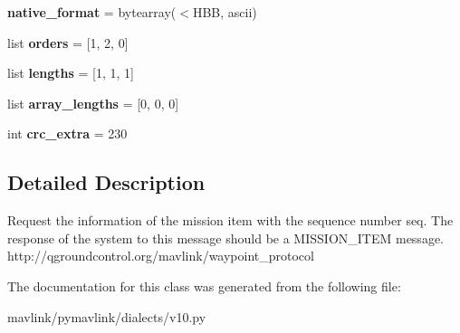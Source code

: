 \begin{DoxyCompactItemize}
{\bfseries native\+\_\+format} = bytearray(\textquotesingle{}$<$H\+BB\textquotesingle{}, \textquotesingle{}ascii\textquotesingle{})
\item 
\mbox{\label{classpymavlink_1_1dialects_1_1v10_1_1MAVLink__mission__request__message_ad0709ae37d6b09b8a4cb89353f0a8ded}} 
list {\bfseries orders} = \mbox{[}1, 2, 0\mbox{]}
\item 
\mbox{\label{classpymavlink_1_1dialects_1_1v10_1_1MAVLink__mission__request__message_a5cfed370abcae043f068c40ef0138bff}} 
list {\bfseries lengths} = \mbox{[}1, 1, 1\mbox{]}
\item 
\mbox{\label{classpymavlink_1_1dialects_1_1v10_1_1MAVLink__mission__request__message_a67e423fe7339dafe3b66f28c023abd98}} 
list {\bfseries array\+\_\+lengths} = \mbox{[}0, 0, 0\mbox{]}
\item 
\mbox{\label{classpymavlink_1_1dialects_1_1v10_1_1MAVLink__mission__request__message_a9386cf0e995a715a79a05f1bc103632d}} 
int {\bfseries crc\+\_\+extra} = 230
\end{DoxyCompactItemize}


\subsection{Detailed Description}
\begin{DoxyVerb}Request the information of the mission item with the sequence
number seq. The response of the system to this message should
be a MISSION_ITEM message.
http://qgroundcontrol.org/mavlink/waypoint_protocol
\end{DoxyVerb}
 

The documentation for this class was generated from the following file\+:\begin{DoxyCompactItemize}
\item 
mavlink/pymavlink/dialects/v10.\+py\end{DoxyCompactItemize}
